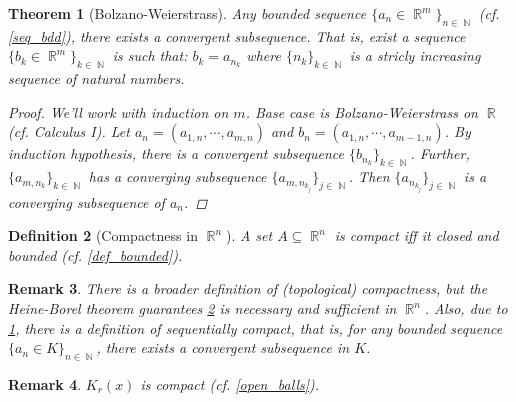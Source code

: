 \documentclass[12pt]{article}
\DeclareMathOperator{\R}{\mathbb{R}}
\DeclareMathOperator{\N}{\mathbb{N}}
\newcommand{\seq}[2]{\{{#1}\}_{#2\in\N}}
\newtheorem{theorem}{Theorem}[subsection]
\newtheorem{definition}[theorem]{Definition}
\newtheorem{remark}[theorem]{Remark}
\begin{document}
\begin{theorem}[Bolzano-Weierstrass]
  \label{bolzano_weierstrass}
  Any bounded sequence $\seq{a_n\in\R^m}{n}$ (cf. \ref{seq_bdd}), there exists a convergent subsequence. That is, exist a sequence $\seq{b_k\in \R^m}{k}$ is such that: $b_k=a_{n_k}$
  where $\seq{n_k}{k}$ is a stricly increasing sequence of natural numbers.
  \begin{proof}
    We'll work with induction on $m$. Base case is Bolzano-Weierstrass on $\R$ (cf. Calculus I). Let $a_n=(a_{1,n},\cdots, a_{m,n})$ and $b_n=(a_{1,n},\cdots, a_{m-1,n})$. By induction hypothesis, there is a convergent subsequence $\seq{b_{n_k}}{k}$. Further, $\seq{a_{m,n_k}}{k}$ has a converging subsequence $\seq{a_{m,n_{k_j}}}{j}$. Then $\seq{a_{n_{k_j}}}{j}$ is a converging subsequence of $a_n$.
  \end{proof}
\end{theorem}

\begin{definition}[Compactness in $\R^n$]
  \label{def_compact}
  A set $A\subseteq \R^n$ is compact iff it closed and bounded (cf. \ref{def_bounded}).
\end{definition}

\begin{remark}
  There is a broader definition of (topological) compactness, but the Heine-Borel theorem guarantees \ref{def_compact} is necessary and sufficient in $\R^n$. Also, due to \ref{bolzano_weierstrass}, there is a definition of sequentially compact, that is, for any bounded sequence $\seq{a_n\in K}{n}$, there exists a convergent subsequence in $K$.
\end{remark}

\begin{remark}
  $K_r(x)$ is compact (cf. \ref{open_balls}).
\end{remark}
\end{document}
